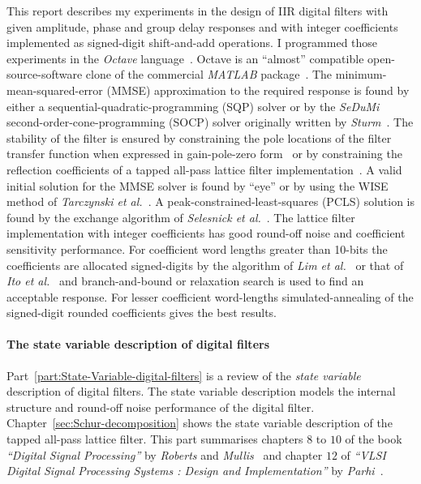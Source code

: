 \documentclass[a4paper,twoside,10pt,english]{report}
\begin{document}
This report describes my experiments in the design of IIR digital filters with
given amplitude, phase and group delay responses and with integer coefficients
implemented as signed-digit shift-and-add operations. I programmed those
experiments in the \emph{Octave} language~\cite{Eaton_Octave}. Octave is an
``almost'' compatible open-source-software clone of the commercial
\emph{MATLAB} package~\cite{Mathworks_MATLAB}. The minimum-mean-squared-error
(MMSE) approximation to the required response is found by either a
sequential-quadratic-programming (SQP) solver or by the \emph{SeDuMi}
second-order-cone-programming (SOCP) solver originally written by
\emph{Sturm}~\cite{Sturm_SeDuMi_GitHub}. The stability of the filter is
ensured by constraining the pole locations of the filter transfer function
when expressed in gain-pole-zero
form~\cite{Deczky_MinPSynthesisIIRDigitalFilters,
  Richards_DeczkyRecursiveDecimator} or by constraining the reflection
coefficients of a tapped all-pass lattice filter
implementation~\cite{GrayMarkel_DigitalLatticeAndLadderFilterSynthesis,
  Parhi_VLSIDigitalSignalProcessingSystems}. A valid initial solution for the
MMSE solver is found by ``eye'' or by using the WISE method of
\emph{Tarczynski et
  al.}~\cite{TarczynskiCainHermanowiczRojewski_WISEMethodDesignIIRFilters}. A
peak-constrained-least-squares (PCLS) solution is found by the exchange
algorithm of \emph{Selesnick et
  al.}~\cite{SelesnickLangBurrus_ConstrainedLeastSquareMultiBandFIRFilters}.
The lattice filter implementation with integer coefficients has good round-off
noise and coefficient sensitivity performance. For coefficient word lengths
greater than 10-bits the coefficients are allocated signed-digits by the
algorithm of \emph{Lim et
  al.}~\cite{Lim_SignedPowerOfTwoAllocationDigitalFilters} or that of
\emph{Ito et al.}~\cite{Ito_PowersOfTwoAllocationFIR} and branch-and-bound or
relaxation search is used to find an acceptable response. For lesser
coefficient word-lengths simulated-annealing of the signed-digit rounded
coefficients gives the best results.

\paragraph{The state variable description of digital filters}
Part~\ref{part:State-Variable-digital-filters} is a review of the \emph{state
  variable} description of digital filters. The state variable description
models the internal structure and round-off noise performance of the digital
filter. Chapter~\ref{sec:Schur-decomposition} shows the state variable
description of the tapped all-pass lattice filter. This part summarises
chapters $8$ to $10$ of the book \emph{``Digital Signal Processing''} by
\emph{Roberts} and \emph{Mullis}~\cite{RobertsMullis_DigitalSignalProcessing}
and chapter $12$ of \emph{``VLSI Digital Signal Processing Systems : Design
  and Implementation''} by
\emph{Parhi}~\cite{Parhi_VLSIDigitalSignalProcessingSystems}.
\end{document}
